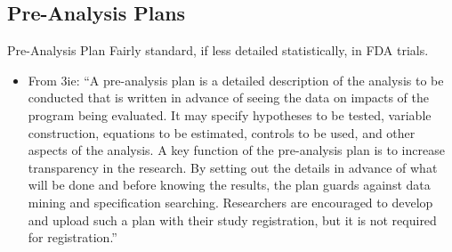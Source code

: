 \documentclass{beamer}
\begin{document}
\subsection{Pre-Analysis Plans}
\begin{frame}{Pre-Analysis Plan}
Fairly standard, if less detailed statistically, in FDA trials.
\begin{itemize}
\item
From 3ie: ``A pre-analysis plan is a detailed description of the analysis to be conducted that is written in advance of seeing the data on impacts of the program being evaluated. It may specify hypotheses to be tested, variable construction, equations to be estimated, controls to be used, and other aspects of the analysis. A key function of the pre-analysis plan is to increase transparency in the research. By setting out the details in advance of what will be done and before knowing the results, the plan guards against data mining and specification searching. Researchers are encouraged to develop and upload such a plan with their study registration, but it is not required for registration.''
\end{itemize}
\end{frame}


\end{document}
